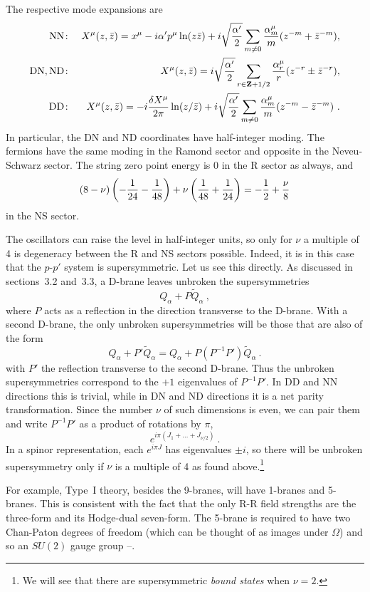 \documentclass[12pt]{article}
\def\be{\begin{equation}}
\def\ee{\end{equation}}
\def\bea{\begin{eqnarray}}
\def\eea{\end{eqnarray}}
\def\ap{\alpha'}
\def\Z{{\bf Z}}
\newcommand{\zb}{{\bar{z}}}
\begin{document}
The respective mode expansions are 
\bea
{\rm NN\colon}&& X^\mu(z,\zb) = x^\mu - i\ap p^\mu
\ln(z\zb) + i\sqrt{\ap\over2} \sum_{m\neq0} {\alpha_m^\mu\over
m}(z^{-m}+\zb^{-m}), \nonumber\\
{\rm DN, ND\colon}&& X^\mu(z,\zb) = i\sqrt{\ap\over2} \sum_{r \in\Z +1/2}
{\alpha_r^\mu\over r}(z^{-r}\pm\zb^{-r}),
\label{modexps}\\
{\rm DD\colon}&& X^\mu(z,\zb) = -i \frac{\delta X^\mu}{2\pi} \ln(z/\zb)
+ i\sqrt{\ap\over2} \sum_{m\neq0}
{\alpha_m^\mu\over m}(z^{-m}-\zb^{-m})\ . \nonumber
\eea
In particular, the DN and ND coordinates have half-integer moding.
The fermions have the same
moding in the Ramond sector and opposite in the Neveu-Schwarz sector.  The
string zero point energy is 0 in the R sector as always, and
\be
(8-\nu)\left(-{1\over 24} - {1\over 48}\right) 
+ \nu \left({1\over 48} + {1\over 24}\right) = -{1\over 2} + {\nu\over 8}
\label{nszpe}
\ee
in the NS sector.

The oscillators can raise the level in half-integer
units, so only for $\nu$ a multiple of 4 is degeneracy between the R and NS
sectors possible.  Indeed, it is in this case that the $p$-$p'$ system is
supersymmetric.  Let us see this directly.  
As discussed in sections~3.2 and~3.3, a D-brane leaves unbroken the
supersymmetries
\be
Q_\alpha+ P {\tilde Q}_\alpha\ , \label{unb1}
\ee
where $P$ acts as a reflection in the direction transverse to
the D-brane.  With a second D-brane, the only unbroken supersymmetries will
be those that are also of the form
\be
Q_\alpha+ P' {\tilde Q}_\alpha = Q_\alpha+ P (P^{-1}P') {\tilde Q}_\alpha\ .
\ee
with $P'$ the reflection transverse to
the second D-brane.
Thus the unbroken supersymmetries correspond to the $+1$ eigenvalues of
$P^{-1}P'$.  In DD and NN directions this is trivial, while in DN and ND
directions it is a net parity transformation.  Since the number $\nu$ of
such dimensions is even, we can pair them and write $P^{-1}P'$ as a product
of rotations by $\pi$, 
\be
e^{i\pi (J_1 + \ldots + J_{\nu/2}) }\ .
\ee
In a spinor representation, each $e^{i\pi J}$ has eigenvalues $\pm
{i}$, so there will be unbroken supersymmetry only if $\nu$ is a
multiple of 4 as found above.\footnote{We will see that
there are supersymmetric {\it bound states} when $\nu = 2$.}

For example, 
Type~I theory, besides the 9-branes, will have 1-branes and 5-branes.
This is consistent with the fact that the only R-R field strengths are the
three-form and its Hodge-dual seven-form.  The 5-brane is required to have
two Chan-Paton degrees of freedom (which can be thought of as images under
$\Omega$) and so an $SU(2)$ gauge group \cite{witinst}--\cite{GP}.
\end{document}
